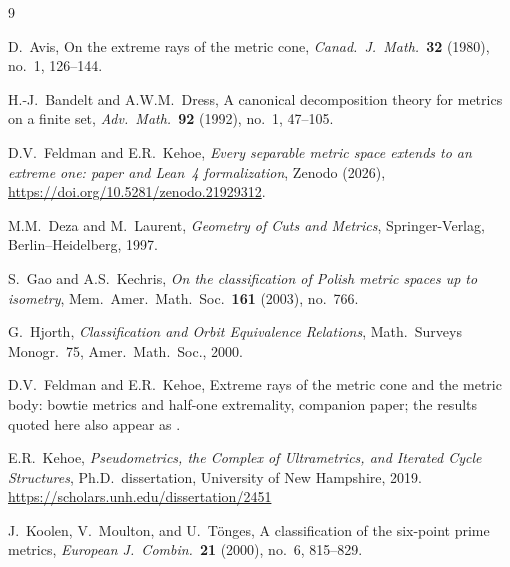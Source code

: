 \documentclass[11pt]{article}
\theoremstyle{definition}
\theoremstyle{remark}
\begin{document}
\begin{thebibliography}{9}

D.~Avis, On the extreme rays of the metric cone,
\textit{Canad.\ J.\ Math.}~\textbf{32} (1980), no.~1, 126--144.

H.-J.~Bandelt and A.W.M.~Dress, A canonical decomposition theory for metrics on a finite
set, \textit{Adv.\ Math.}~\textbf{92} (1992), no.~1, 47--105.

D.V.~Feldman and E.R.~Kehoe, \textit{Every separable metric space extends to an extreme
one: paper and Lean~4 formalization}, Zenodo (2026),
\url{https://doi.org/10.5281/zenodo.21929312}.

M.M.~Deza and M.~Laurent, \textit{Geometry of Cuts and Metrics}, Springer-Verlag,
Berlin--Heidelberg, 1997.

S.~Gao and A.S.~Kechris, \textit{On the classification of Polish metric spaces up to
isometry}, Mem.\ Amer.\ Math.\ Soc.\ \textbf{161} (2003), no.~766.

G.~Hjorth, \textit{Classification and Orbit Equivalence Relations}, Math.\ Surveys
Monogr.~75, Amer.\ Math.\ Soc., 2000.

D.V.~Feldman and E.R.~Kehoe, Extreme rays of the metric cone and the metric body: bowtie
metrics and half-one extremality, companion paper; the results quoted here also appear as
\cite[Ch.~2]{Kehoe19}.

E.R.~Kehoe, \textit{Pseudometrics, the Complex of Ultrametrics, and Iterated Cycle
Structures}, Ph.D.\ dissertation, University of New Hampshire, 2019.
\url{https://scholars.unh.edu/dissertation/2451}

J.~Koolen, V.~Moulton, and U.~T\"{o}nges, A classification of the six-point prime metrics,
\textit{European J.\ Combin.}~\textbf{21} (2000), no.~6, 815--829.

\end{thebibliography}
\end{document}
